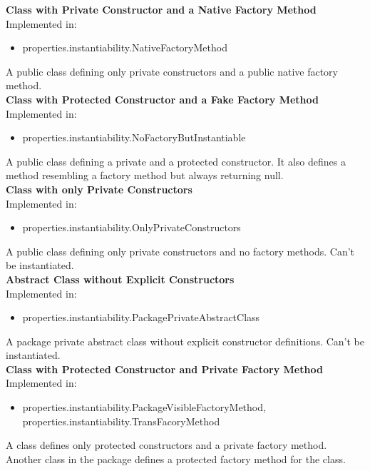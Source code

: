 \documentclass{article}
\begin{document}
\noindent
\textbf{Class with Private Constructor and a Native Factory Method}\\
Implemented in: 
\begin{itemize}
    \item properties.instantiability.NativeFactoryMethod
\end{itemize}
A public class defining only private constructors and a public native factory method.\\

\noindent
\textbf{Class with Protected Constructor and a Fake Factory Method}\\
Implemented in: 
\begin{itemize}
    \item properties.instantiability.NoFactoryButInstantiable
\end{itemize}
A public class defining a private and a protected constructor. It also defines a method resembling a factory method but always returning null.\\

\noindent
\textbf{Class with only Private Constructors}\\
Implemented in: 
\begin{itemize}
    \item properties.instantiability.OnlyPrivateConstructors
\end{itemize}
A public class defining only private constructors and no factory methods. Can't be instantiated.\\

\noindent
\textbf{Abstract Class without Explicit Constructors}\\
Implemented in: 
\begin{itemize}
    \item properties.instantiability.PackagePrivateAbstractClass
\end{itemize}
A package private abstract class without explicit constructor definitions. Can't be instantiated.\\

\noindent
\textbf{Class with Protected Constructor and Private Factory Method}\\
Implemented in: 
\begin{itemize}
    \item properties.instantiability.PackageVisibleFactoryMethod, properties.instantiability.TransFacoryMethod
\end{itemize}
A class defines only protected constructors and a private factory method. Another class in the package defines a protected factory method for the class.\\
\end{document}
